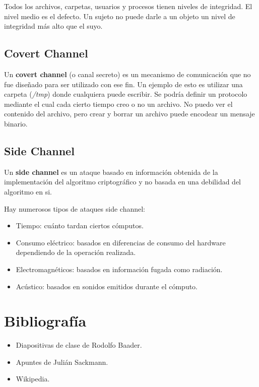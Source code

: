 \documentclass[]{article}
\begin{document}
Todos los archivos, carpetas, usuarios y procesos tienen niveles de integridad. El nivel medio es el defecto. Un sujeto no puede darle a un objeto un nivel de integridad más alto que el suyo.


\subsection{Covert Channel}
Un \textbf{covert channel} (o canal secreto) es un mecanismo de comunicación que no fue diseñado para ser utilizado con ese fin. Un ejemplo de esto es utilizar una carpeta (\emph{/tmp}) donde cualquiera puede escribir. Se podría definir un protocolo mediante el cual cada cierto tiempo creo o no un archivo. No puedo ver el contenido del archivo, pero crear y borrar un archivo puede encodear un mensaje binario.

\subsection{Side Channel}
Un \textbf{side channel} es un ataque basado en información obtenida de la implementación del algoritmo criptográfico y no basada en una debilidad del algoritmo en si.

Hay numerosos tipos de ataques side channel:
\begin{itemize}
	\item Tiempo: cuánto tardan ciertos cómputos.
	\item Consumo eléctrico: basados en diferencias de consumo del hardware dependiendo de la operación realizada.
	\item Electromagnéticos: basados en información fugada como radiación.
	\item Acústico: basados en sonidos emitidos durante el cómputo.
\end{itemize}

\newpage



\newpage


\newpage


\newpage

% 





\section{Bibliografía}
\begin{itemize}
	\item Diapositivas de clase de Rodolfo Baader.
	\item Apuntes de Julián Sackmann.
	\item Wikipedia.
\end{itemize}
\end{document}
